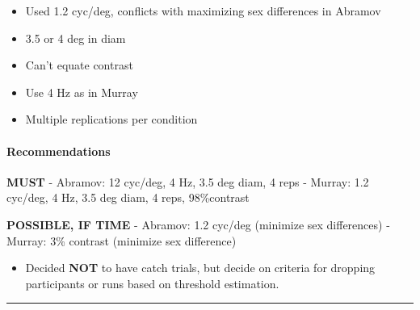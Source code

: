 \documentclass[]{article}
\providecommand{\tightlist}{%
  \setlength{\itemsep}{0pt}\setlength{\parskip}{0pt}}
\let\oldparagraph\paragraph
\renewcommand{\paragraph}[1]{\oldparagraph{#1}\mbox{}}
\begin{document}
\begin{itemize}
\tightlist
\item
  Used 1.2 cyc/deg, conflicts with maximizing sex differences in Abramov
\item
  3.5 or 4 deg in diam
\item
  Can't equate contrast
\item
  Use 4 Hz as in Murray
\item
  Multiple replications per condition
\end{itemize}

\hypertarget{recommendations}{%
\paragraph{Recommendations}\label{recommendations}}

\textbf{MUST} - Abramov: 12 cyc/deg, 4 Hz, 3.5 deg diam, 4 reps -
Murray: 1.2 cyc/deg, 4 Hz, 3.5 deg diam, 4 reps, 98\%contrast

\textbf{POSSIBLE, IF TIME} - Abramov: 1.2 cyc/deg (minimize sex
differences) - Murray: 3\% contrast (minimize sex difference)

\begin{itemize}
\tightlist
\item
  Decided \textbf{NOT} to have catch trials, but decide on criteria for
  dropping participants or runs based on threshold estimation.
\end{itemize}

\begin{center}\rule{0.5\linewidth}{\linethickness}\end{center}
\end{document}
